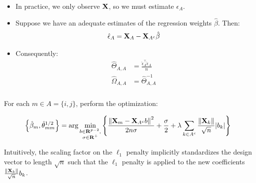 \begin{frame}[fragile] \frametitle{}
    \begin{itemize}
        \item In practice, we only observe $\mathbf{X}$, so we must estimate
            $\epsilon_A$.
        \item Suppose we have an adequate estimates of the regression weights
            $\hat\beta$.  Then:
            $$
            \hat\epsilon_A = \mathbf{X}_A - \mathbf{X}_{A^c}\hat\beta
            $$
        \item Consequently:
            \vspace{-0.1cm}
            \begin{align*}
                \hat\Theta_{A, A}
                &= \frac{\hat\epsilon_A^\top\hat\epsilon_A}{n}    \\
                \hat\Omega_{A, A} &= \hat\Theta_{A, A}^{-1}
            \end{align*}
    \end{itemize}
\end{frame}
\begin{frame}[fragile] \frametitle{}

    For each $m \in A = \{i, j\}$, perform the optimization: 

    $$
    \left\{\hat\beta_m, \hat\theta^{1/2}_{mm}\right\}
    =
    \arg\min_{\substack{b\in\mathbf{R}^{p-2},\\\sigma \in \mathbf{R}^+}}
    \left\{
    \frac{\left\lVert\mathbf{X}_m - \mathbf{X}_{A^c}b\right\rVert^2}{2n\sigma}
    + \frac{\sigma}{2} 
    + \lambda\sum_{k\in A^c}\frac{\left\lVert\mathbf{X}_k\right\rVert}{\sqrt{n}}|b_k|
    \right\}
    $$
    
    Intuitively, the scaling factor on the $\ell_1$ penalty implicitly standardizes
    the design vector to length $\sqrt{n}$ such that the $\ell_1$ penalty is
    applied to the new coefficients $\frac{\left\lVert\mathbf{X}_k\right\rVert}{\sqrt n}b_k$.

\end{frame}
\begin{frame}[fragile] \frametitle{}
\end{frame}
